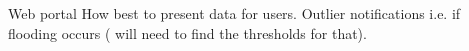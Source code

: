 Web portal
How best to present data for users. Outlier notifications i.e. if flooding occurs ( will need to find the thresholds for that). 